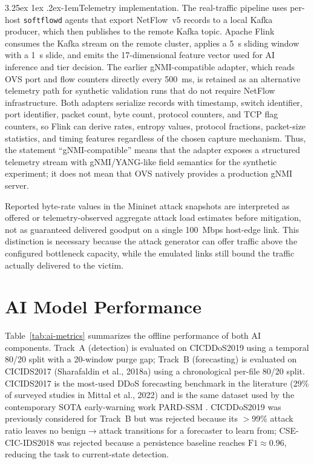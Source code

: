 \documentclass[12pt, a4paper, reqno, oneside]{book}
\makeatletter
\renewcommand\paragraph{\@startsection{paragraph}{5}{\z@}%
  {3.25ex \@plus1ex \@minus.2ex}{-1em}{\normalfont\normalsize\bfseries}}
\makeatother
\begin{document}
\paragraph{Telemetry implementation.}
The real-traffic pipeline uses per-host \texttt{softflowd} agents that
export NetFlow~v5 records to a local Kafka producer, which then publishes
to the remote Kafka topic. Apache Flink consumes the Kafka stream on the
remote cluster, applies a 5~s sliding window with a 1~s slide, and emits
the 17-dimensional feature vector used for AI inference and tier decision.
The earlier gNMI-compatible adapter, which reads OVS port and flow
counters directly every 500~ms, is retained as an alternative telemetry
path for synthetic validation runs that do not require NetFlow
infrastructure. Both adapters serialize records with timestamp, switch
identifier, port identifier, packet count, byte count, protocol counters,
and TCP flag counters, so Flink can derive rates, entropy values, protocol
fractions, packet-size statistics, and timing features regardless of the
chosen capture mechanism. Thus, the statement ``gNMI-compatible'' means
that the adapter exposes a structured telemetry stream with gNMI/YANG-like
field semantics for the synthetic experiment; it does not mean that OVS
natively provides a production gNMI server.

Reported byte-rate values in the Mininet attack snapshots are interpreted as
offered or telemetry-observed aggregate attack load estimates before
mitigation, not as guaranteed delivered goodput on a single 100~Mbps host-edge
link. This distinction is necessary because the attack generator can offer
traffic above the configured bottleneck capacity, while the emulated links
still bound the traffic actually delivered to the victim.

\section{AI Model Performance}
\label{sec:metrics}

Table~\ref{tab:ai-metrics} summarizes the offline performance of both AI
components. Track~A (detection) is evaluated on CICDDoS2019 using a temporal
80/20 split with a 20-window purge gap; Track~B (forecasting) is evaluated on
CICIDS2017 (Sharafaldin et al., 2018a) using a chronological per-file 80/20
split. CICIDS2017 is the most-used DDoS forecasting benchmark in the
literature (29\% of surveyed studies in Mittal et al., 2022) and is the same
dataset used by the contemporary SOTA early-warning work PARD-SSM
\cite{hiremath2026pardssm}. CICDDoS2019 was previously considered for Track~B
but was rejected because its $>$99\% attack ratio leaves no
benign$\rightarrow$attack transitions for a forecaster to learn from; CSE-CIC-IDS2018
was rejected because a persistence baseline reaches $\text{F1}\approx 0.96$,
reducing the task to current-state detection.
\end{document}
